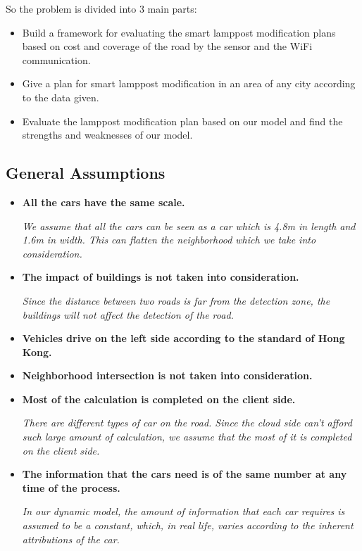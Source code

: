 \documentclass[12pt]{article}
\theoremstyle{definition}
\theoremstyle{remark}
\numberwithin{equation}{section}
\begin{document}
		So the problem is divided into 3 main parts:
		\begin{itemize}
			\item Build a framework for evaluating the smart lamppost modification plans based on cost and coverage of the road by the sensor and the WiFi communication.
			\item Give a plan for smart lamppost modification in an area of any city according to the data given.\cite{Map}
			\item Evaluate the lamppost modification plan based on our model and find the strengths and weaknesses of our model.
		\end{itemize}
		\subsection{General Assumptions}
		\begin{itemize}
			\item \textbf{All the cars have the same scale.}
			
			\textit{We assume that all the cars can be seen as a car which is 4.8m in length and 1.6m in width. This can flatten the neighborhood which we take into consideration.}
			\item \textbf{The impact of buildings is not taken into consideration.}
			
			\textit{Since the distance between two roads is far from the detection zone, the buildings will not affect the detection of the road.}
			\item \textbf{Vehicles drive on the left side according to the standard of Hong Kong.}
			\item \textbf{Neighborhood intersection is not taken into consideration.}
			\item \textbf{Most of the calculation is completed on the client side.}
			
			\textit{There are different types of car on the road. Since the cloud side can't afford such large amount of calculation, we assume that the most of it is completed on the client side.}
			\item \textbf{The information that the cars need is of the same number at any time of the process.}
			
			\textit{In our dynamic model, the amount of information that each car requires is assumed to be a constant, which, in real life, varies according to the inherent attributions of the car. }
		\end{itemize}
	
\end{document}
